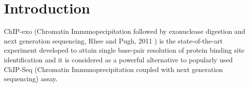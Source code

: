 \documentclass[11pt]{article}\usepackage[]{graphicx}\usepackage[]{color}
\begin{document}





\newpage

\section{Introduction}
\label{sec:intro}


ChIP-exo (Chromatin Immunopecipitation followed by exonuclease
digestion and next generation sequencing, Rhee and Pugh, 2011
\cite{exo1}) is the state-of-the-art experiment developed to attain
single base-pair resolution of protein binding site identification and
it is considered as a powerful alternative to popularly used ChIP-Seq
(Chromatin Immunoprecipitation coupled with next generation
sequencing) assay.
\end{document}
